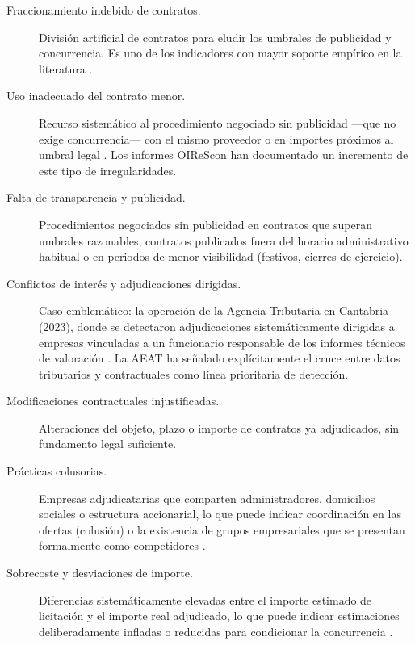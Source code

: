 \documentclass[11pt,a4paper,spanish]{book}
\numberwithin{equation}{chapter}
\numberwithin{figure}{chapter}
\begin{document}
\begin{description}
  \item[Fraccionamiento indebido de contratos.] Divisi{\'o}n artificial de contratos para eludir los umbrales de publicidad y concurrencia. Es uno de los indicadores con mayor soporte emp{\'i}rico en la literatura \cite{OCP2024RedFlags,OCP2016RedFlags}.

  \item[Uso inadecuado del contrato menor.] Recurso sistem{\'a}tico al procedimiento negociado sin publicidad ---que no exige concurrencia--- con el mismo proveedor o en importes pr{\'o}ximos al umbral legal \cite{OIReScon2025}. Los informes OIReScon han documentado un incremento de este tipo de irregularidades.

  \item[Falta de transparencia y publicidad.] Procedimientos negociados sin publicidad en contratos que superan umbrales razonables, contratos publicados fuera del horario administrativo habitual o en periodos de menor visibilidad (festivos, cierres de ejercicio).

  \item[Conflictos de inter{\'e}s y adjudicaciones dirigidas.] Caso emblem{\'a}tico: la operaci{\'o}n de la Agencia Tributaria en Cantabria (2023), donde se detectaron adjudicaciones sistem{\'a}ticamente dirigidas a empresas vinculadas a un funcionario responsable de los informes t{\'e}cnicos de valoraci{\'o}n \cite{AEATCantabria2023}. La AEAT ha se{\~n}alado expl{\'i}citamente el cruce entre datos tributarios y contractuales como l{\'i}nea prioritaria de detecci{\'o}n.

  \item[Modificaciones contractuales injustificadas.] Alteraciones del objeto, plazo o importe de contratos ya adjudicados, sin fundamento legal suficiente.

  \item[Pr{\'a}cticas colusorias.] Empresas adjudicatarias que comparten administradores, domicilios sociales o estructura accionarial, lo que puede indicar coordinaci{\'o}n en las ofertas (colusi{\'o}n) o la existencia de grupos empresariales que se presentan formalmente como competidores \cite{OCP2024RedFlags}.

  \item[Sobrecoste y desviaciones de importe.] Diferencias sistem{\'a}ticamente elevadas entre el importe estimado de licitaci{\'o}n y el importe real adjudicado, lo que puede indicar estimaciones deliberadamente infladas o reducidas para condicionar la concurrencia \cite{Coviello2023Italian}.
\end{description}
\end{document}
